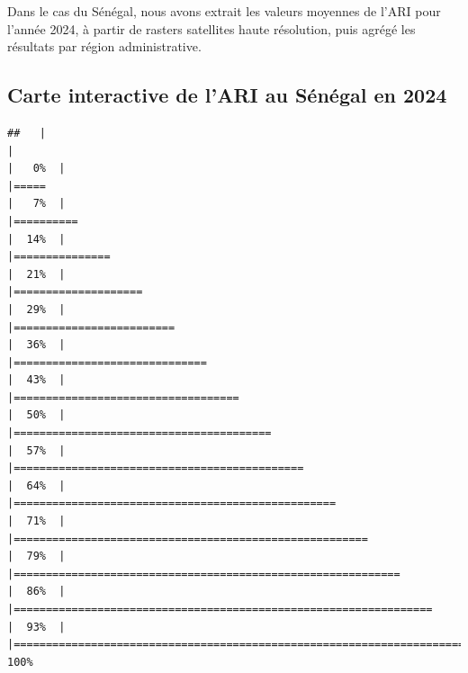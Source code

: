 \documentclass[
]{book}
\begin{document}
Dans le cas du Sénégal, nous avons extrait les valeurs moyennes de l'ARI pour l'année 2024, à partir de rasters satellites haute résolution, puis agrégé les résultats par région administrative.

\subsection{Carte interactive de l'ARI au Sénégal en 2024}\label{carte-interactive-de-lari-au-suxe9nuxe9gal-en-2024}

\begin{verbatim}
##   |                                                                              |                                                                      |   0%  |                                                                              |=====                                                                 |   7%  |                                                                              |==========                                                            |  14%  |                                                                              |===============                                                       |  21%  |                                                                              |====================                                                  |  29%  |                                                                              |=========================                                             |  36%  |                                                                              |==============================                                        |  43%  |                                                                              |===================================                                   |  50%  |                                                                              |========================================                              |  57%  |                                                                              |=============================================                         |  64%  |                                                                              |==================================================                    |  71%  |                                                                              |=======================================================               |  79%  |                                                                              |============================================================          |  86%  |                                                                              |=================================================================     |  93%  |                                                                              |======================================================================| 100%
\end{verbatim}
\end{document}
